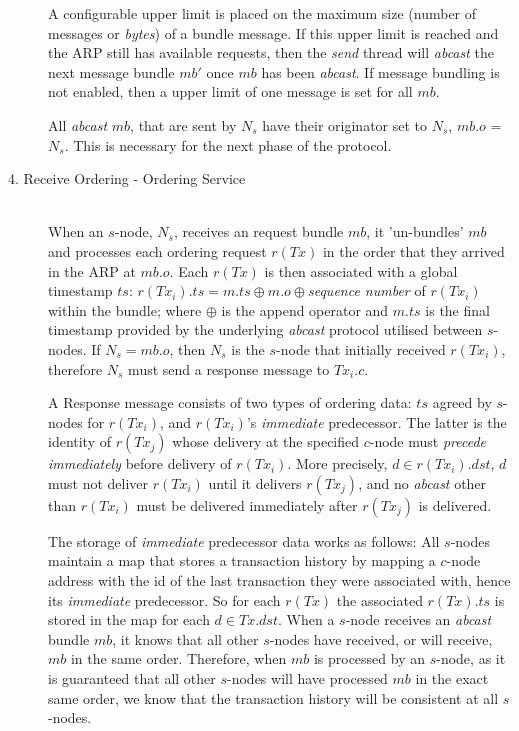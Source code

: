 \begin{description}
		A configurable upper limit is placed on the maximum size (number of messages or \emph{bytes}) of a bundle message.  If this upper limit is reached and the ARP still has available requests, then the \emph{send} thread will \emph{abcast} the next message bundle $mb'$ once $mb$ has been \emph{abcast}.  If message bundling is not enabled, then a upper limit of one message is set for all $mb$.  
		
		All \emph{abcast} $mb$, that are sent by $N_s$ have their originator set to $N_s$, $mb.o$ = $N_s$.  This is necessary for the next phase of the protocol.  
		
		\item[4. Receive Ordering - Ordering Service] \hfill \\
		When an $s$-node, $N_s$, receives an request bundle $mb$, it 'un-bundles' $mb$ and processes each ordering request $r(Tx)$ in the order that they arrived in the ARP at $mb.o$.  Each $r(Tx)$ is then associated with  a global timestamp $ts$: $r(Tx_i).ts = m.ts\oplus m.o \oplus$\emph{sequence number} of $r(Tx_i)$ within the bundle; where $\oplus$ is the append operator and $m.ts$ is the final timestamp provided by the underlying \emph{abcast} protocol utilised between $s$-nodes.  If $N_s = mb.o$, then $N_s$ is the $s$-node that initially received $r(Tx_i)$, therefore $N_s$ must send a response message to $Tx_i.c$.    
		
		A Response message consists of two types of ordering data: $ts$ agreed by $s$-nodes for $r(Tx_i)$, and $r(Tx_i)$'s \emph{immediate} predecessor.  The latter is the identity of $r(Tx_j)$ whose delivery at the specified $c$-node must \emph{precede} \emph{immediately} before delivery of $r(Tx_i)$.  More precisely, $d \in r(Tx_i).dst$, $d$ must not deliver $r(Tx_i)$ until it delivers $r(Tx_j)$, and no \emph{abcast} other than $r(Tx_i)$ must be delivered immediately after $r(Tx_j)$ is delivered.
		
		The storage of \emph{immediate} predecessor data works as follows: All $s$-nodes maintain a map that stores a transaction history by mapping a $c$-node address with the id of the last transaction they were associated with, hence its \emph{immediate} predecessor.  So for each $r(Tx)$ the associated $r(Tx).ts$ is stored in the map for each $d \in Tx.dst$. When a $s$-node receives an \emph{abcast} bundle $mb$, it knows that all other $s$-nodes have received, or will receive, $mb$ in the same order.  Therefore, when $mb$ is processed by an $s$-node, as it is guaranteed that all other $s$-nodes will have processed $mb$ in the exact same order, we know that the transaction history will be consistent at all $s$-nodes.  
		

\end{description}
